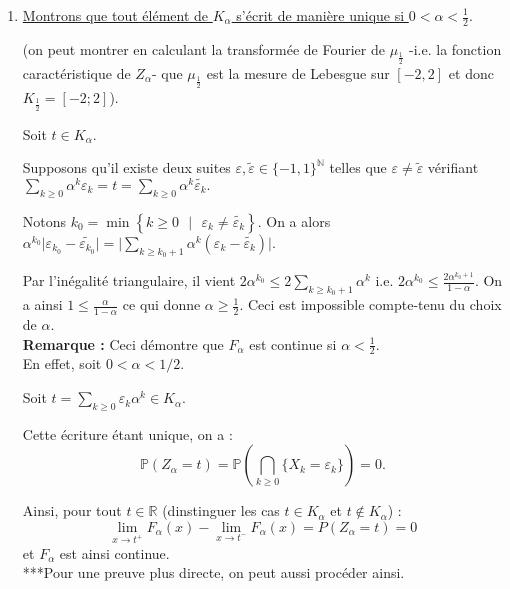 \begin{enumerate}
\item \underline{Montrons que tout élément de $K_{\alpha}$ s'écrit de manière unique si $0<\alpha<\frac{1}{2}.$}
    
(on peut montrer en calculant la transformée de Fourier de $\mu_{\frac{1}{2}}$ -i.e. la fonction caractéristique de $Z_{\alpha}$- que $\mu_{\frac{1}{2}}$ est la mesure de Lebesgue sur $[-2,2]$ et donc $K_{\frac{1}{2}}=[-2;2]$).

Soit $t\in K_{\alpha}.$ 

Supposons qu'il existe deux suites $\varepsilon,\tilde{\varepsilon}\in\{-1,1\}^\mathbb{N}$ telles que $\varepsilon\neq \tilde{\varepsilon}$ vérifiant $\displaystyle \sum_{k\geq 0}\alpha^{k}\varepsilon_{k}=t=\sum_{k\geq 0}\alpha^{k}\tilde{\varepsilon_{k}}.$

Notons $k_{0}=\min\left\{ k\geq 0\mbox{ }|\mbox{ } \varepsilon_{k}\neq \tilde{\varepsilon_{k}} \right\}.$ On a alors $\displaystyle \alpha^{k_{0}}\vert \varepsilon_{k_{0}}-\tilde{\varepsilon_{k_{0}}}\vert =\big\vert \sum_{k\geq k_{0}+1}\alpha^{k}\left(\varepsilon_{k}-\tilde{\varepsilon_{k}}\right)\big\vert.$

Par l'inégalité triangulaire, il vient $\displaystyle 2\alpha^{k_{0}}\leq 2\sum_{k\geq k_{0}+1}\alpha^{k} \mbox{ i.e. } 2\alpha^{k_{0}}\leq \frac{2\alpha^{k_{0}+1}}{1-\alpha}.$
On a ainsi $\displaystyle 1\leq \frac{\alpha}{1-\alpha}$ ce qui donne $\alpha\geq \frac{1}{2}.$ Ceci est impossible compte-tenu du choix de $\alpha.$\\

\textbf{Remarque :} Ceci démontre que $F_{\alpha}$ est continue si $\alpha<\frac{1}{2}.$\\

En effet, soit $0<\alpha<1/2.$ 

Soit $t=\sum\limits_{k\geq 0}\varepsilon_{k}\alpha^{k}\in K_{\alpha}.$

Cette écriture étant unique, on a : $$\mathbb{P}(Z_{\alpha}=t)=\mathbb{P}\left( \bigcap_{k\geq 0}\{X_{k}=\varepsilon_{k}\} \right)=0.$$

Ainsi, pour tout $t\in\mathbb{R}$ (dinstinguer les cas $t\in K_{\alpha}$ et $t\notin K_{\alpha}$) : $$\lim_{x\rightarrow t^{+}}F_{\alpha}(x)-\lim_{x\rightarrow t^{-}}F_{\alpha}(x)=P(Z_{\alpha}=t)=0$$ et $F_{\alpha}$ est ainsi continue.\\ 


***Pour une preuve plus directe, on peut aussi procéder ainsi.


\end{enumerate}
